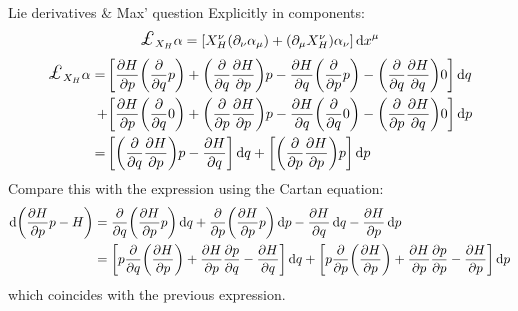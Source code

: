 \begin{aside}{Lie derivatives \& Max' question}
    Explicitly in components:
    \begin{equation*}
        \lied{X_H}{\alpha} = \qty[X_H^{\nu}(\partial_{\nu}\alpha_{\mu}) + (\partial_{\mu} X_H^{\nu})\alpha_{\nu}]\dd{x}^{\mu}
    \end{equation*}
    \begin{equation*}
        \begin{split}
            \lied{X_H}{\alpha} =\, &\qty[\pdv{H}{p}\qty(\pdv{}{q}p) + \qty(\pdv{}{q}\pdv{H}{p})p - \pdv{H}{q}\qty(\pdv{}{p}p) - \qty(\pdv{}{q}\pdv{H}{q})0]\dd{q} \\
                                + &\qty[\pdv{H}{p}\qty(\pdv{}{q}0) + \qty(\pdv{}{p}\pdv{H}{p})p - \pdv{H}{q}\qty(\pdv{}{q} 0) - \qty(\pdv{}{p}\pdv{H}{q})0]\dd{p} \\
                               =\,&\qty[ \qty(\pdv{}{q}\pdv{H}{p})p - \pdv{H}{q}]\dd{q} + \qty[\qty(\pdv{}{p}\pdv{H}{p})p]\dd{p}\\
        \end{split}
    \end{equation*}
    Compare this with the expression using the Cartan equation:
    \begin{equation*}
        \begin{split}
            \dd{\qty(\pdv{H}{p}p - H)} &= \pdv{}{q}\qty(\pdv{H}{p}p)\dd{q} + \pdv{}{p}\qty(\pdv{H}{p}p)\dd{p} - \pdv{H}{q}\dd{q} - \pdv{H}{p}\dd{p}\\
                                       &= \qty[p\pdv{}{q}\qty(\pdv{H}{p}) + \pdv{H}{p}\pdv{p}{q} - \pdv{H}{q}]\dd{q} + \qty[p\pdv{}{p}\qty(\pdv{H}{p}) + \pdv{H}{p}\pdv{p}{p} - \pdv{H}{p}]\dd{p}
        \end{split}
    \end{equation*}
    which coincides with the previous expression.

\end{aside}
